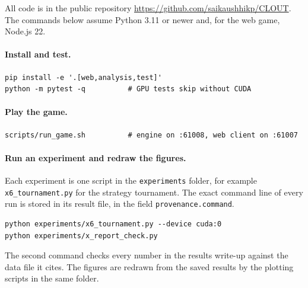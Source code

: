 \documentclass[11pt,a4paper,oneside]{report}
\newcommand{\code}[1]{\texttt{#1}}
\newcommand{\repo}{\url{https://github.com/saikaushhikp/CLOUT}}
\begin{document}
All code is in the public repository \repo. The commands below assume Python 3.11 or newer and, for the
web game, Node.js 22.

\paragraph{Install and test.}
\begin{verbatim}
pip install -e '.[web,analysis,test]'
python -m pytest -q          # GPU tests skip without CUDA
\end{verbatim}

\paragraph{Play the game.}
\begin{verbatim}
scripts/run_game.sh          # engine on :61008, web client on :61007
\end{verbatim}

\paragraph{Run an experiment and redraw the figures.}
Each experiment is one script in the \code{experiments} folder, for example \code{x6\_tournament.py} for
the strategy tournament. The exact command line of every run is stored in its result file, in the field
\code{provenance.command}.
\begin{verbatim}
python experiments/x6_tournament.py --device cuda:0
python experiments/x_report_check.py
\end{verbatim}
The second command checks every number in the results write-up against the data file it cites. The
figures are redrawn from the saved results by the plotting scripts in the same folder.
\end{document}
